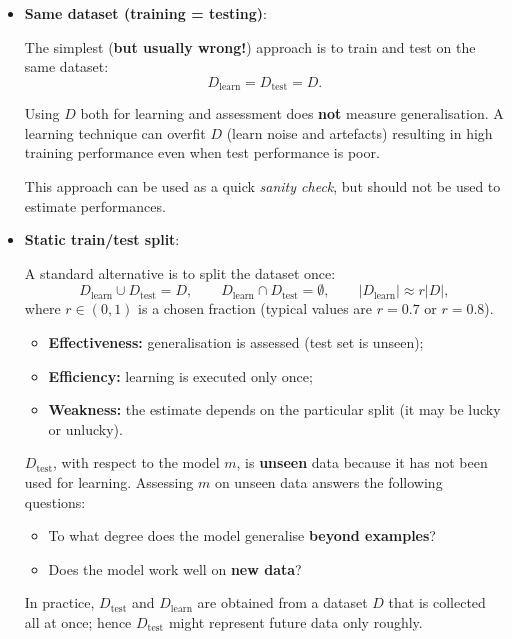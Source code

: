 \begin{itemize}[itemsep=0.4em]
\item \textbf{Same dataset (training = testing)}:

The simplest (\textbf{but usually wrong!}) approach is to train and test on the same dataset:
$$
D_{\text{learn}} = D_{\text{test}} = D.
$$

\begin{warningblock}
Using $D$ both for learning and assessment does \textbf{not} measure generalisation.
A learning technique can overfit $D$ (learn noise and artefacts) resulting in high training performance even when test performance is poor.
\end{warningblock}

This approach can be used as a quick \emph{sanity check}, but should not be used to estimate performances.

\item \textbf{Static train/test split}: 

A standard alternative is to split the dataset once:
$$
D_{\text{learn}} \cup D_{\text{test}} = D,
\qquad
D_{\text{learn}} \cap D_{\text{test}} = \emptyset,
\qquad
|D_{\text{learn}}| \approx r|D|,
$$
where $r \in (0,1)$ is a chosen fraction (typical values are $r = 0.7$ or $r = 0.8$).

\begin{definitionblock}
\begin{itemize}[noitemsep]
    \item \textbf{Effectiveness:} generalisation is assessed (test set is unseen);
    \item \textbf{Efficiency:} learning is executed only once;
    \item \textbf{Weakness:} the estimate depends on the particular split (it may be lucky or unlucky).
\end{itemize}
\end{definitionblock}

\begin{observationblock}
$D_{\text{test}}$, with respect to the model $m$, is \textbf{unseen} data because it has not been used for learning. Assessing $m$ on unseen data answers the following questions:
\begin{itemize}
    \item To what degree does the model generalise \textbf{beyond examples}?
    \item Does the model work well on \textbf{new data}?
\end{itemize}
In practice, $D_{\text{test}}$ and $D_{\text{learn}}$ are obtained from a dataset $D$ that is collected all at once; hence $D_{\text{test}}$ might represent future data only roughly.
\end{observationblock}


\end{itemize}

